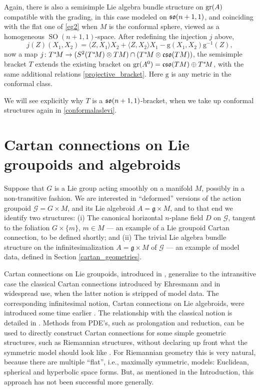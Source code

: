\documentclass[leqno,12pt]{amsart} %
\newcommand\refreshpage{\newpage}
\newcommand\refreshpage{}
\begin{document}
Again, there is also a semisimple Lie algebra bundle structure on $\operatorname{\operatorname{gr}}(A)$ compatible
with the grading, in this case modeled on $\mathfrak{so}(n + 1, 1)$, and coinciding with the flat
one of \ref{eg2} when $M$ is the conformal sphere, viewed as a homogeneous
$\operatorname{SO}(n + 1, 1)$-space. After redefining the injection $j$ above,
\begin{equation*}
  j(Z)(X_1, X_2) = \langle Z, X_1\rangle X_2 + \langle Z, X_2\rangle X_1 -
  {\mathrm g}(X_1,X_2){\mathrm g}^{-1}(Z),
\end{equation*}
now a map
$j \colon T^*\!M\rightarrow (S^2(T^*\!M)\otimes TM) \cap (T^*\!M \otimes \mathfrak{cso}(TM)) $, the
semisimple bracket $T$ extends the existing bracket on
$\operatorname{\operatorname{gr}}(A^0)=\mathfrak{cso}(TM) \oplus T^*\!M$, with the same additional relations
\eqref{projective_bracket}.  Here ${\mathrm g} $ is any metric in the conformal class.

We will see explicitly why $T$ is a $\mathfrak{so}(n + 1, 1)$-bracket, when we take up conformal
structures again in \ref{conformalaslevi}.

\refreshpage
\section{Cartan connections on Lie groupoids and algebroids}\label{cartan_section}
Suppose that $G$ is a Lie group acting smoothly on a manifold $M$, possibly in a
non-transitive fashion.  We are interested in ``deformed'' versions of the action groupoid
${\mathcal G} = G \times M$, and its Lie algebroid $A = {\mathfrak g} \times M$, and to
that end we identify two structures: (i) The canonical horizontal $n$-plane field $D$ on
${\mathcal G} $, tangent to the foliation $G \times \{m\}$, $m \in M$ --- an example of a
Lie groupoid {\df Cartan connection}, to be defined shortly; and (ii) The trivial Lie
algebra bundle structure on the infinitesimalization $A = {\mathfrak g} \times M$ of
${\mathcal G} $ --- an example of {\df model data}, defined in Section
\ref{cartan_geometries}.


Cartan connections on Lie groupoids, introduced in \cite[Appendix A]{Blaom_12}, generalize
to the intransitive case the classical Cartan connections introduced by Ehresmann
\cite{Ehresmann_51} and in widespread use, when the latter notion is stripped of model
data. The corresponding infinitesimal notion, Cartan connections on Lie algebroids, were
introduced some time earlier \cite{Blaom_06}. The relationship with the classical notion
is detailed in \cite{Blaom_16b}. Methods from PDE's, such as prolongation and reduction,
can be used to directly construct Cartan connections for some simple geometric structures,
such as Riemannian structures, without declaring up front what the symmetric model should
look like \cite{Blaom_12}. For Riemannian geometry this is very natural, because there are
multiple ``flat'', i.e., maximally symmetric, models: Euclidean, spherical and hyperbolic
space forms. But, as mentioned in the Introduction, this approach has not been successful
more generally.
\end{document}
